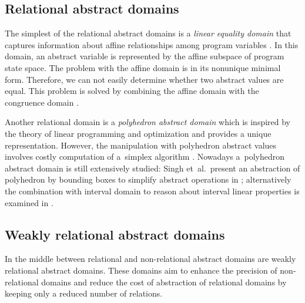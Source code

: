 
\subsection{Relational abstract domains}

The simplest of the relational abstract domains is a \emph{linear equality
domain} that captures information about affine relationships among program
variables \cite{Karr1976}. In this domain, an abstract variable is represented
by the affine subspace of program state space. The problem with the affine
domain is in its nonunique minimal form. Therefore, we can not easily determine
whether two abstract values are equal. This problem is solved by combining
the affine domain with the congruence domain \cite{Granger1991}.

Another relational domain is a \emph{polyhedron abstract domain} which is
inspired by the theory of linear programming and optimization \cite{Cousot1978, Venet2012}
and provides a unique representation. However, the manipulation with polyhedron
abstract values involves costly computation of a~simplex algorithm
\cite{Schrijver1986}. Nowadays a~polyhedron abstract domain is still
extensively studied: Singh et~al.~present an abstraction of polyhedron by
bounding boxes to simplify abstract operations in \cite{Singh2017};
alternatively the combination with interval domain to reason about interval
linear properties is examined in \cite{Chen2009}.

\subsection{Weakly relational abstract domains}

In the middle between relational and non-relational abstract domains are
weakly relational abstract domains. These domains aim to enhance the precision
of non-relational domains and reduce the cost of abstraction of relational
domains by keeping only a reduced number of relations.

